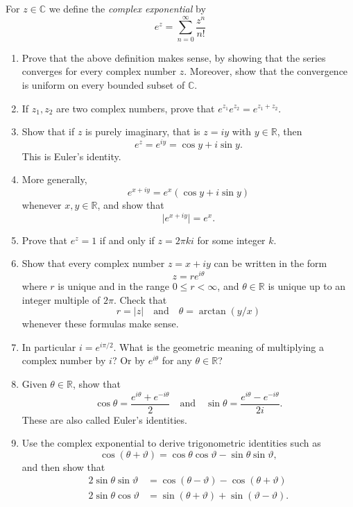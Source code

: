 \documentclass[12 pt, letterpaper]{hmcpset}
\begin{document}
\pagebreak

\begin{problem}[4.]
	For $z \in \mathbb{C}$ we define the \emph{complex exponential} by
	\[
		e^{z} = \sum_{n = 0}^{\infty} \frac{z^{n}}{n!}
	\]
	\begin{enumerate}
		\item Prove that the above definition makes sense, by showing that the series converges for every complex number $z$. Moreover, show that the convergence is uniform on every bounded subset of $\mathbb{C}$.
		\item If $z_{1}, z_2$ are two complex numbers, prove that $e^{z_{1}} e^{z_{2}} = e^{z_{1} + z_{2}}$.
		\item Show that if $z$ is purely imaginary, that is $z = i y$ with $y \in \mathbb{R}$, then
			\[
				e^{z} = e^{i y} = \cos{y} + i \sin{y}.
			\]
			This is Euler's identity.
		\item More generally,
			\[
				e^{x + iy} = e^{x} (\cos{y} + i \sin{y})
			\]
			whenever $x, y \in \mathbb{R}$, and show that
			\[
				\lvert e^{x + i y} \rvert = e^{x}.
			\]
		\item Prove that $e^{z} = 1$ if and only if $z = 2 \pi k i$ for some integer $k$.
		\item Show that every complex number $z = x + i y$ can be written in the form
			\[
				z = r e^{i \theta}
			\]
			where $r$ is unique and in the range $0 \le r < \infty$, and $\theta \in \mathbb{R}$ is unique up to an integer multiple of $2 \pi$. Check that
			 \[
				r = \lvert z \rvert \quad \text{and} \quad \theta = \arctan{(y / x)}
			\]
			whenever these formulas make sense.
		\item In particular $i = e^{i \pi / 2}$. What is the geometric meaning of multiplying a complex number by $i$? Or by $e^{i \theta}$ for any $\theta \in \mathbb{R}$?
		\item Given $\theta \in \mathbb{R}$, show that
			\[
				\cos{\theta} = \frac{e^{i \theta} + e^{-i \theta}}{2} \quad \text{and} \quad \sin{\theta} = \frac{e^{i \theta} - e^{- i \theta}}{2 i}.
			\]
			These are also called Euler's identities.
		\item Use the complex exponential to derive trigonometric identities such as
			\[
				\cos{(\theta + \vartheta)} = \cos{\theta} \cos{\vartheta} - \sin{\theta} \sin{\vartheta},
			\]
			and then show that
			\begin{align*}
				2 \sin{\theta} \sin{\vartheta} & = \cos{(\theta - \vartheta)} - \cos{(\theta + \vartheta)} \\
				2 \sin{\theta} \cos{\vartheta} & = \sin{(\theta + \vartheta)} + \sin{(\vartheta - \vartheta)}.
			\end{align*}
	\end{enumerate}
\end{problem}
\end{document}
